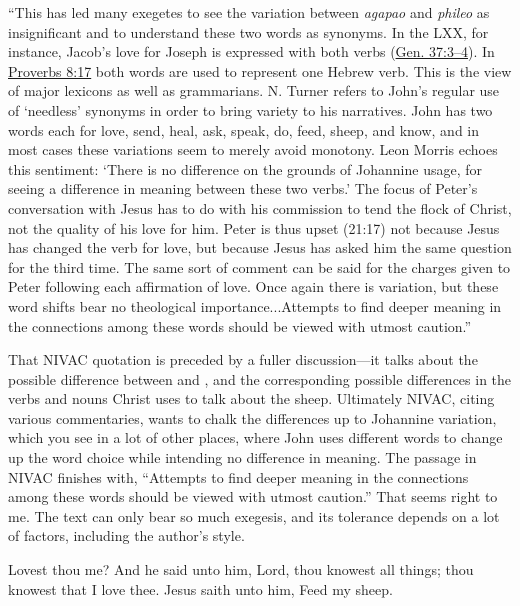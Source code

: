 {\begin{compactdesc}
							\item[NIVAC NT 01 4609--4610] ``This has led many exegetes to see the variation between \textit{agapao} and \textit{phileo} as insignificant and to understand these two words as synonyms. In the LXX, for instance, Jacob's love for Joseph is expressed with both verbs (\hyperref[GENESIS-37-3]{Gen. 37:3--4}). In \hyperref[PROVERBS-8-17]{Proverbs 8:17} both words are used to represent one Hebrew verb. This is the view of major lexicons as well as grammarians. N. Turner refers to John's regular use of `needless' synonyms in order to bring variety to his narratives. John has two words each for love, send, heal, ask, speak, do, feed, sheep, and know, and in most cases these variations seem to merely avoid monotony. Leon Morris echoes this sentiment: `There is no difference on the grounds of Johannine usage, for seeing a difference in meaning between these two verbs.' The focus of Peter's conversation with Jesus has to do with his commission to tend the flock of Christ, not the quality of his love for him. Peter is thus upset (21:17) not because Jesus has changed the verb for love, but because Jesus has asked him the same question for the third time. The same sort of comment can be said for the charges given to Peter following each affirmation of love. Once again there is variation, but these word shifts bear no theological importance...Attempts to find deeper meaning in the connections among these words should be viewed with utmost caution.''
						\end{compactdesc}
					That NIVAC quotation is preceded by a fuller discussion---it talks about the possible difference between  and , and the corresponding possible differences in the verbs and nouns Christ uses to talk about the sheep. Ultimately NIVAC, citing various commentaries, wants to chalk the differences up to Johannine variation, which you see in a lot of other places, where John uses different words to change up the word choice while intending no difference in meaning. The passage in NIVAC finishes with, ``Attempts to find deeper meaning in the connections among these words should be viewed with utmost caution.'' That seems right to me. The text can only bear so much exegesis, and its tolerance depends on a lot of factors, including the author's style.
					}%
			Lovest thou me? And he said unto him, Lord, thou knowest all things; thou knowest that I love thee. Jesus saith unto him, Feed my sheep.

